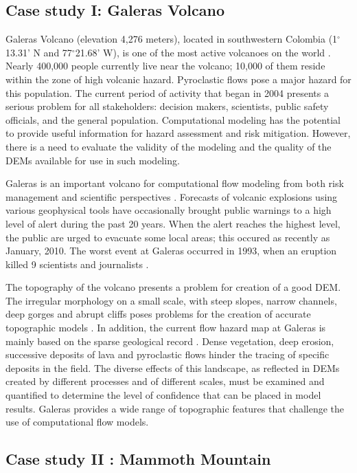 \documentclass[12pt]{article}
\newcommand{\Deg}{$^{\circ}$}
\begin{document}
\subsection{Case study I: Galeras Volcano}

Galeras Volcano (elevation 4,276 meters), located in southwestern
Colombia (1\Deg 13.31' N and 77\Deg 21.68' W), is one of the most
active volcanoes on the world \citep{hurtado_1997}. Nearly 400,000
people currently live near the volcano; 10,000 of them reside within
the zone of high volcanic hazard. Pyroclastic flows pose a major
hazard for this population. The current period of activity that began
in 2004 presents a serious problem for all stakeholders: decision
makers, scientists, public safety officials, and the general
population.  Computational modeling has the potential to provide
useful information for hazard assessment and risk mitigation.
However, there is a need to evaluate the validity of the modeling and
the quality of the DEMs available for use in such modeling.

Galeras is an important volcano for computational flow modeling from
both risk management and scientific perspectives
\citep{calvache1997}. Forecasts of volcanic explosions using various
geophysical tools \citep{narvaez_1997} have occasionally brought
public warnings to a high level of alert during the past 20
years. When the alert reaches the highest level, the public are urged
to evacuate some local areas; this occured as recently as January,
2010. The worst event at Galeras occurred in 1993, when an eruption
killed 9 scientists and journalists \citep{baxter1997}.

The topography of the volcano presents a problem for creation of a
good DEM. The irregular morphology on a small scale, with steep
slopes, narrow channels, deep gorges and abrupt cliffs poses problems
for the creation of accurate topographic models
\citep{ordones_2000}. In addition, the current flow hazard map at
Galeras is mainly based on the sparse geological record
\citep{calvache_1990a}. Dense vegetation, deep erosion, successive
deposits of lava and pyroclastic flows hinder the tracing of specific
deposits in the field. The diverse effects of this landscape, as
reflected in DEMs created by different processes and of different
scales, must be examined and quantified to determine the level of
confidence that can be placed in model results. Galeras provides a
wide range of topographic features that challenge the use of
computational flow models.

\subsection{Case study II : Mammoth Mountain}
\end{document}
